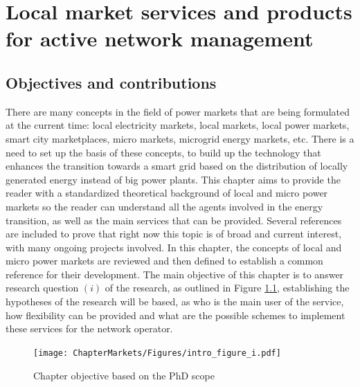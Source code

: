 \renewcommand\labelenumi{(\roman{enumi})}
\renewcommand\theenumi\labelenumi

\chapter{Local market services and products for active network management}
\label{chapterMarkets}

\section{Objectives and contributions}
There are many concepts in the field of power markets that are being formulated at the current time: local electricity markets, local markets, local power markets, smart city marketplaces, micro markets, microgrid energy markets, etc. There is a need to set up the basis of these concepts, to build up the technology that enhances the transition towards a smart grid based on the distribution of locally generated energy instead of big power plants.
This chapter aims to provide the reader with a standardized theoretical background of local and micro power markets so the reader can understand all the agents involved in the energy transition, as well as the main services that can be provided. Several references are included to prove that right now this topic is of broad and current interest, with many ongoing projects involved. In this chapter, the concepts of local and micro power markets are reviewed and then defined to establish a common reference for their development. 
The main objective of this chapter is to answer research question  $(i)$ of the research, as outlined in Figure \ref{fig:chapter_obj_i}, establishing the hypotheses of the research will be based, as who is the main user of the service, how flexibility can be provided and what are the possible schemes to implement these services for the network operator.

\begin{figure}[htbp]
	\centering
	\texttt{[image: ChapterMarkets/Figures/intro\_figure\_i.pdf]}
		\caption{Chapter objective based on the PhD scope}
	\label{fig:chapter_obj_i}  
\end{figure}

